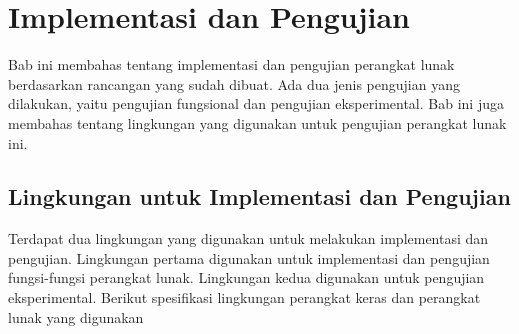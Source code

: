 \chapter{Implementasi dan Pengujian}
\label{chap:implementasi dan pengujian}

Bab ini membahas tentang implementasi dan pengujian perangkat lunak berdasarkan rancangan yang sudah dibuat. Ada dua jenis pengujian yang dilakukan, yaitu pengujian fungsional dan pengujian eksperimental. Bab ini juga membahas tentang lingkungan yang digunakan untuk pengujian perangkat lunak ini.

\section{Lingkungan untuk Implementasi dan Pengujian}
Terdapat dua lingkungan yang digunakan untuk melakukan implementasi dan pengujian. Lingkungan pertama digunakan untuk implementasi dan pengujian fungsi-fungsi perangkat lunak. Lingkungan kedua digunakan untuk pengujian eksperimental. Berikut spesifikasi lingkungan perangkat keras dan perangkat lunak yang digunakan 
